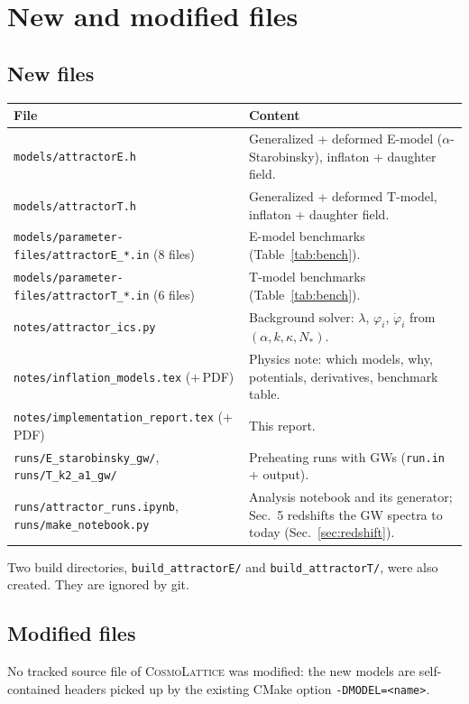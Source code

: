 \documentclass[11pt,a4paper]{article}
\newcommand{\aatt}{\alpha}
\newcommand{\file}[1]{\texttt{#1}}
\begin{document}
\section{New and modified files}
\label{sec:files}

\subsection{New files}
\begin{center}
\renewcommand{\arraystretch}{1.2}
\begin{tabular}{@{}p{}p{}@{}}
\toprule
File & Content \\
\midrule
\file{models/attractorE.h} & Generalized + deformed E-model ($\alpha$-Starobinsky), inflaton + daughter field. \\
\file{models/attractorT.h} & Generalized + deformed T-model, inflaton + daughter field. \\
\file{models/parameter-files/attractorE\_*.in} (8 files) & E-model benchmarks (Table~\ref{tab:bench}). \\
\file{models/parameter-files/attractorT\_*.in} (6 files) & T-model benchmarks (Table~\ref{tab:bench}). \\
\file{notes/attractor\_ics.py} & Background solver: $\lambda$, $\varphi_i$, $\dot\varphi_i$ from $(\aatt,k,\kappa,N_*)$. \\
\file{notes/inflation\_models.tex} (+\,PDF) & Physics note: which models, why, potentials, derivatives, benchmark table. \\
\file{notes/implementation\_report.tex} (+\,PDF) & This report. \\
\file{runs/E\_starobinsky\_gw/}, \file{runs/T\_k2\_a1\_gw/} & Preheating runs with GWs (\file{run.in} + output). \\
\file{runs/attractor\_runs.ipynb}, \file{runs/make\_notebook.py} & Analysis notebook and its generator; Sec.~5 redshifts the GW spectra to today (Sec.~\ref{sec:redshift}). \\
\bottomrule
\end{tabular}
\end{center}

Two build directories, \file{build\_attractorE/} and \file{build\_attractorT/}, were also created. They are ignored by git.

\subsection{Modified files}
No tracked source file of \textsc{CosmoLattice} was modified: the new models are self-contained headers picked up by the existing CMake option \texttt{-DMODEL=<name>}.
\end{document}
